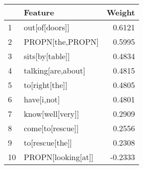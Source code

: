 \begin{tabular}{llr}
\toprule
{} &             Feature &  Weight \\
\midrule
1  &      out[of[doors]] &  0.6121 \\
2  &    PROPN[the,PROPN] &  0.5995 \\
3  &     sits[by[table]] &  0.4834 \\
4  &  talking[are,about] &  0.4815 \\
5  &      to[right[the]] &  0.4805 \\
6  &         have[i,not] &  0.4801 \\
7  &    know[well[very]] &  0.2909 \\
8  &    come[to[rescue]] &  0.2556 \\
9  &     to[rescue[the]] &  0.2308 \\
10 &  PROPN[looking[at]] & -0.2333 \\
\bottomrule
\end{tabular}
